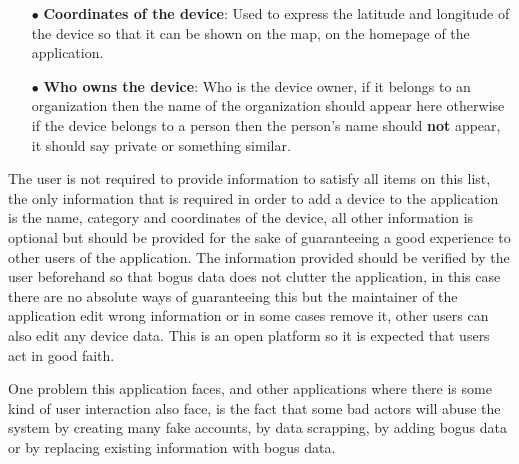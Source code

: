 \begin{itemize}
    \item[$\bullet$]
    \textbf{Coordinates of the device}: Used to express the latitude and longitude of the device so that it can be shown on the map, on the homepage of the application.
    \item[$\bullet$]
    \textbf{Who owns the device}: Who is the device owner, if it belongs to an organization then the name of the organization should appear here otherwise if the device belongs to a person then the person's name should \textbf{not} appear, it should say private or something similar.
\end{itemize}

The user is not required to provide information to satisfy all items on this list, the
only information that is required in order to add a device to the application is
the name, category and coordinates of the device, all other
information is optional but should be provided for the sake of guaranteeing a good
experience to other users of the application. The information provided
should be verified by the user beforehand so that bogus data does not clutter
the application, in this case there are no absolute ways of guaranteeing this
but the maintainer of the application edit wrong information or in some
cases remove it, other users can also edit any device data. This is an
open platform so it is expected that users act in good faith.

One problem this application faces, and other applications where there is
some kind of user interaction also face, is the fact that some bad
actors will abuse the system by creating many fake accounts, by
data scrapping, by adding bogus data or by replacing existing information
with bogus data.




